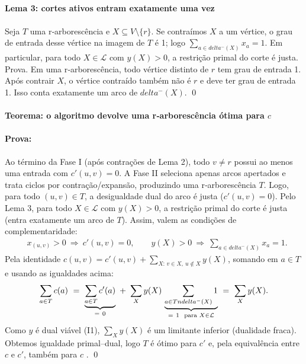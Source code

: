 \documentclass[12pt,a4paper]{article}
\def\emph#1{#1}%
\def\cap{\string n}%
\def\delta{delta}%
\begin{document}
\paragraph{Lema 3: cortes ativos entram exatamente uma vez} 
\paragraph{}
Seja \(T\) uma r‑arborescência e \(X\subseteq V\setminus\{r\}\). Se contraímos \(X\) a um vértice, o grau de entrada desse vértice na imagem de \(T\) é 1; logo \(\sum_{a\in \delta^-(X)} x_a=1\). Em particular, para todo \(X\in\mathcal{L}\) com \(y(X)>0\), a restrição primal do corte é \emph{justa}.\newline
Prova. Em uma r‑arborescência, todo vértice distinto de \(r\) tem grau de entrada 1. Após contrair \(X\), o vértice contraído também não é \(r\) e deve ter grau de entrada 1. Isso conta exatamente um arco de \(\delta^-(X)\). \qed

\paragraph{Teorema: o algoritmo devolve uma r‑arborescência ótima para \(c\)}

\paragraph{Prova:} 
Ao término da Fase I (após contrações de Lema 2), todo \(v\neq r\) possui ao menos uma entrada com \(c'(u,v)=0\). A Fase II seleciona apenas arcos \emph{apertados} e trata ciclos por contração/expansão, produzindo uma r‑arborescência \(T\). Logo, para todo \((u,v)\in T\), a desigualdade dual do arco é \emph{justa} (\(c'(u,v)=0\)). Pelo Lema 3, para todo \(X\in\mathcal{L}\) com \(y(X)>0\), a restrição primal do corte é \emph{justa} (entra exatamente um arco de \(T\)). Assim, valem as condições de \emph{complementaridade}:
\begin{align*}
    &x_{(u,v)}>0\ \Rightarrow\ c'(u,v)=0,\qquad
    y(X)>0\ \Rightarrow\ \sum_{a\in \delta^-(X)} x_a=1.
\end{align*}
Pela identidade \(c(u,v)=c'(u,v)+\sum_{X:\,v\in X,\ u\notin X} y(X)\), somando em \(a\in T\) e usando as igualdades acima: 
\[
    \sum_{a\in T} c(a)\ =\ \underbrace{\sum_{a\in T} c'(a)}_{=\ 0}\ +\ \sum_{X} y(X)\,\underbrace{\sum_{a\in T\cap \delta^-(X)} 1}_{=\ 1\ \text{ para } X\in\mathcal{L}}\ =\ \sum_{X} y(X).
\]
Como \(y\) é dual viável (I1), \(\sum_X y(X)\) é um limitante inferior (dualidade fraca). Obtemos igualdade primal–dual, logo \(T\) é ótimo para \(c'\) e, pela equivalência entre \(c\) e \(c'\), também para \(c\) \cite{frank2014,schrijver2003comb}. \qed
\end{document}
